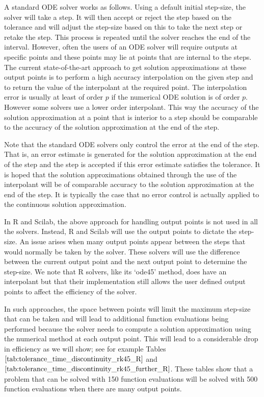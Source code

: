 A standard ODE solver works as follows. Using a default initial step-size, the solver will take a step. It will then accept or reject the step based on the tolerance and will adjust the step-size based on this to take the next step or retake the step. This process is repeated until the solver reaches the end of the interval. However, often the users of an ODE solver will require outputs at specific points and these points may lie at points that are internal to the steps. The current state-of-the-art approach to get solution approximations at these output points is to perform a high accuracy interpolation on the given step and to return the value of the interpolant at the required point. The interpolation error is usually at least of order $p$ if the numerical ODE solution is of order $p$. However some solvers use a lower order interpolant. This way the accuracy of the solution approximation at a point that is interior to a step should be comparable to the accuracy of the solution approximation at the end of the step.

Note that the standard ODE solvers only control the error at the end of the step. That is, an error estimate is generated for the solution approximation at the end of the step and the step is accepted if this error estimate satisfies the tolerance. It is hoped that the solution approximations obtained through the use of the interpolant will be of comparable accuracy to the solution approximation at the end of the step. It is typically the case that no error control is actually applied to the continuous solution approximation.

In R and Scilab, the above approach for handling output points is not used in all the solvers. Instead, R and Scilab will use the output points to dictate the step-size. An issue arises when many output points appear between the steps that would normally be taken by the solver. These solvers will use the difference between the current output point and the next output point to determine the step-size. We note that R solvers, like its `ode45' method, does have an interpolant but that their implementation still allows the user defined output points to affect the efficiency of the solver. 

In such approaches, the space between points will limit the maximum step-size that can be taken and will lead to additional function evaluations being performed because the solver needs to compute a solution approximation using the numerical method at each output point. This will lead to a considerable drop in efficiency as we will show; see for example Tables $\ref{tab:tolerance_time_discontinuity_rk45_R}$ and $\ref{tab:tolerance_time_discontinuity_rk45_further_R}$. These tables show that a problem that can be solved with 150 function evaluations will be solved with 500 function evaluations when there are many output points. 

